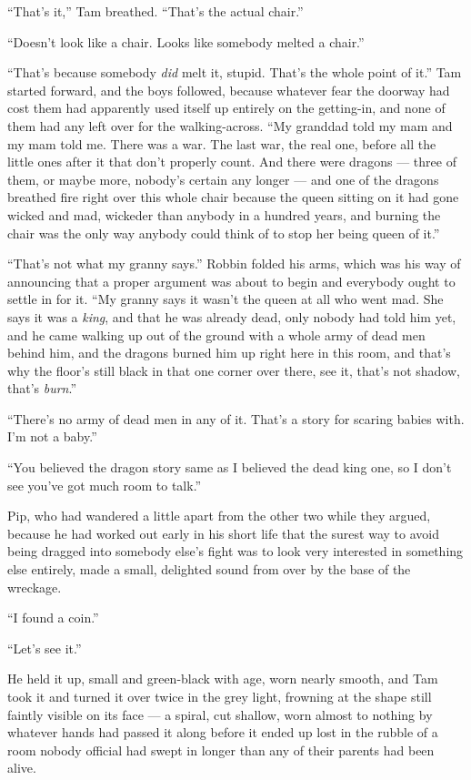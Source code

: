 \sceneBreak

“That’s it,” Tam breathed. “That’s the actual chair.”

“Doesn’t look like a chair. Looks like somebody melted a chair.”

“That’s because somebody \textit{did} melt it, stupid. That’s the whole point of it.” Tam started forward, and the boys followed, because whatever fear the doorway had cost them had apparently used itself up entirely on the getting-in, and none of them had any left over for the walking-across. “My granddad told my mam and my mam told me. There was a war. The last war, the real one, before all the little ones after it that don’t properly count. And there were dragons — three of them, or maybe more, nobody’s certain any longer — and one of the dragons breathed fire right over this whole chair because the queen sitting on it had gone wicked and mad, wickeder than anybody in a hundred years, and burning the chair was the only way anybody could think of to stop her being queen of it.”

“That’s not what my granny says.” Robbin folded his arms, which was his way of announcing that a proper argument was about to begin and everybody ought to settle in for it. “My granny says it wasn’t the queen at all who went mad. She says it was a \textit{king}, and that he was already dead, only nobody had told him yet, and he came walking up out of the ground with a whole army of dead men behind him, and the dragons burned him up right here in this room, and that’s why the floor’s still black in that one corner over there, see it, that’s not shadow, that’s \textit{burn}.”

“There’s no army of dead men in any of it. That’s a story for scaring babies with. I’m not a baby.”

“You believed the dragon story same as I believed the dead king one, so I don’t see you’ve got much room to talk.”

\sceneBreak

Pip, who had wandered a little apart from the other two while they argued, because he had worked out early in his short life that the surest way to avoid being dragged into somebody else’s fight was to look very interested in something else entirely, made a small, delighted sound from over by the base of the wreckage.

“I found a coin.”

“Let’s see it.”

He held it up, small and green-black with age, worn nearly smooth, and Tam took it and turned it over twice in the grey light, frowning at the shape still faintly visible on its face — a spiral, cut shallow, worn almost to nothing by whatever hands had passed it along before it ended up lost in the rubble of a room nobody official had swept in longer than any of their parents had been alive.

